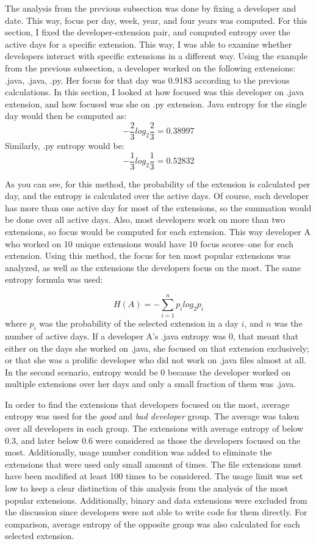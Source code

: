 The analysis from the previous subsection was done by fixing a developer and date. This way, focus per day, week, year, and four years was computed. For this section, I fixed the developer-extension pair, and computed entropy over the active days for a specific extension. This way, I was able to examine whether developers interact with specific extensions in a different way. Using the example from the previous subsection, a developer worked on the following extensions: .java, .java, .py. Her focus for that day was 0.9183 according to the previous calculations. In this section, I looked at how focused was this developer on .java extension, and how focused was she on .py extension. Java entropy for the single day would then be computed as: 
\[-\frac{2}{3} log_2 \frac{2}{3} = 0.38997\]
Similarly, .py entropy would be:
\[- \frac{1}{3} log_2 \frac{1}{3} = 0.52832\]

As you can see, for this method, the probability of the extension is calculated per day, and the entropy is calculated over the active days. Of course, each developer has more than one active day for most of the extensions, so the summation would be done over all active days. Also, most developers work on more than two extensions, so focus would be computed for each extension. This way developer A who worked on 10 unique extensions would have 10 focus scores–one for each extension. Using this method, the focus for ten most popular extensions was analyzed, as well as the extensions the developers focus on the most. The same entropy formula was used:

\[H(A) = -\sum_{i=1}^{n} p_i log_2 p_i\]
where \(p_i\) was the probability of the selected extension in a day \(i\), and \(n\) was the number of active days. If a developer A’s .java entropy was 0, that meant that either on the days she worked on .java, she focused on that extension exclusively; or that she was a prolific developer who did not work on .java files almost at all. In the second scenario, entropy would be 0 because the developer worked on multiple extensions over her days and only a small fraction of them was .java. \par

In order to find the extensions that developers focused on the most, average entropy was used for the \textit{good} and \textit{bad developer} group. The average was taken over all developers in each group. The extensions with average entropy of below 0.3, and later below 0.6 were considered as those the developers focused on the most. Additionally, usage number condition was added to eliminate the extensions that were used only small amount of times. The file extensions must have been modified at least 100 times to be considered. The usage limit was set low to keep a clear distinction of this analysis from the analysis of the most popular extensions. Additionally, binary and data extensions were excluded from the discussion since developers were not able to write code for them directly. For comparison, average entropy of the opposite group was also calculated for each selected extension. \par

